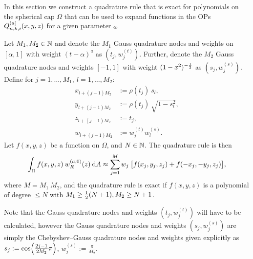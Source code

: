 \documentclass[11pt, oneside]{article}   	%
\begin{document}
In this section we construct a quadrature rule that is exact for polynomials on the spherical cap $\Omega$ that can be used to expand functions in the OPs $Q_{n,k,i}^{(a)}(x,y,z)$ for a given parameter $a$.

\begin{theorem}\label{Theorem:quadrule}
	Let $M_1, M_2 \in \mathbb{N}$ and denote the $M_1$ Gauss quadrature nodes and weights on $[\alpha,1]$ with weight $(t - \alpha)^a$ as $(t_j, w_j^{(t)})$. Further, denote the $M_2$ Gauss quadrature nodes and weights $[-1,1]$ with weight $(1 - x^2)^{-\frac{1}{2}}$ as $(s_j, w_j^{(s)})$.
Define for $j = 1,\dots,M_1, \: l=1,\dots,M_2$:
\begin{align*}
	x_{l+(j-1)M_2} &:= \rho(t_j) \: s_l, \\
	y_{l+(j-1)M_2} &:= \rho(t_j) \: \sqrt{1-s_l^2}, \\
	z_{l+(j-1)M_2} &:= t_j, \\
	w_{l+(j-1)M_2} &:= w_j^{(t)} w_l^{(s)}.
\end{align*}
Let $f(x,y,z)$ be a function on $\Omega$, and $N \in \mathbb{N}$. The quadrature rule is then
\begin{align*}
	\int_\Omega f(x,y,z) \: w_R^{(a,0)}(z) \: {\rm d} A \approx \sum_{j=1}^{M} w_j \: \big[ f(x_j, y_j, z_j) + f(-x_j, -y_j, z_j) \big],
\end{align*}
where $M = M_1 \: M_2$, and the quadrature rule is exact if $f(x,y,z)$ is a polynomial of degree $\le N$ with $M_1 \ge \frac{1}{2} (N+1), M_2 \ge N+1$.
\end{theorem}

\begin{remark} 
	Note that the Gauss quadrature nodes and weights $(t_j, w_j^{(t)})$ will have to be calculated, however the Gauss quadrature nodes and weights $(s_j, w_j^{(s)})$ are simply the Chebyshev--Gauss quadrature nodes and weights given explicitly \cite[3.5.23]{DLMF} as $s_j := \cos \fpr(\frac{2j - 1}{2M_2} \pi)$, $w_j^{(s)} := \frac{\pi}{M_2}$.
\end{remark}
\end{document}
